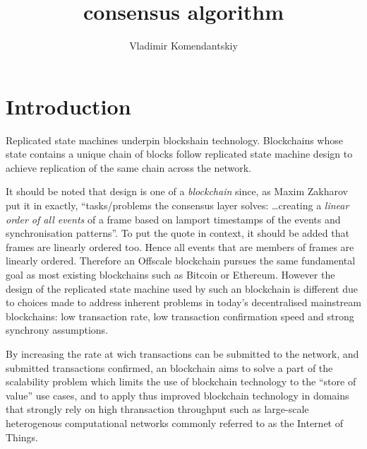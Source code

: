 \documentclass[a4paper,11pt]{article}
\title{consensus algorithm}
\author{Vladimir Komendantskiy}
\begin{document}
\maketitle



\section{Introduction}

Replicated state machines underpin blockshain technology. Blockchains whose state contains a unique
chain of blocks follow replicated state machine design to achieve replication of the same chain
across the network.

It should be noted that design is one of a \emph{blockchain} since, as Maxim Zakharov put
it in \cite{notes} exactly, ``tasks/problems the consensus layer solves: \dots creating a
\emph{linear order of all events} of a frame based on lamport timestamps of the events and
synchronisation patterns''. To put the quote in context, it should be added that frames are linearly
ordered too. Hence all events that are members of frames are linearly ordered. Therefore an Offscale
blockchain pursues the same fundamental goal as most existing blockchains such as Bitcoin or
Ethereum. However the design of the replicated state machine used by such an blockchain is
different due to choices made to address inherent problems in today's decentralised mainstream
blockchains: low transaction rate, low transaction confirmation speed and strong synchrony
assumptions.

By increasing the rate at wich transactions can be submitted to the network, and submitted
transactions confirmed, an blockchain aims to solve a part of the scalability problem which
limits the use of blockchain technology to the ``store of value'' use cases, and to apply thus
improved blockchain technology in domains that strongly rely on high thransaction throughput such as
large-scale heterogenous computational networks commonly referred to as the Internet of Things.
\end{document}
